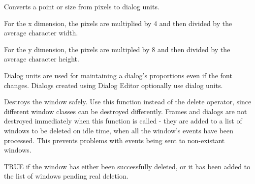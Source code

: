 \label{wxwindowconvertpixelstodialog}



Converts a point or size from pixels to dialog units.

For the x dimension, the pixels are multiplied by 4 and then divided by the average
character width.

For the y dimension, the pixels are multipled by 8 and then divided by the average
character height.


Dialog units are used for maintaining a dialog's proportions even if the font changes.
Dialogs created using Dialog Editor optionally use dialog units.





\label{wxwindowdestroy}


Destroys the window safely. Use this function instead of the delete operator, since
different window classes can be destroyed differently. Frames and dialogs
are not destroyed immediately when this function is called - they are added
to a list of windows to be deleted on idle time, when all the window's events
have been processed. This prevents problems with events being sent to non-existant
windows.


TRUE if the window has either been successfully deleted, or it has been added
to the list of windows pending real deletion.



